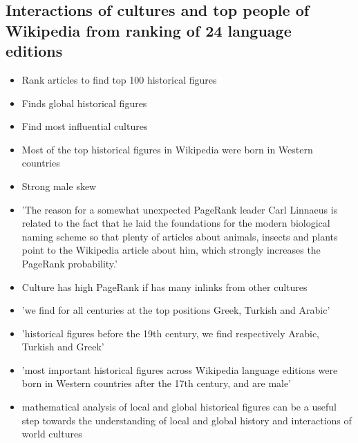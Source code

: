 \documentclass[11pt]{report}
\begin{document}
\subsection{Interactions of cultures and top people of Wikipedia from ranking of 24 language editions}
\begin{itemize}
\item Rank articles to find top 100 historical figures
\item Finds global historical figures
\item Find most influential cultures
\item Most of the top historical figures in Wikipedia were born in Western countries
\item Strong male skew
\item 'The reason for a somewhat unexpected PageRank leader Carl Linnaeus is related to the fact that he laid the foundations for the modern biological naming scheme so that plenty of articles about animals, insects and plants point to the Wikipedia article about him, which strongly increases the PageRank probability.'
\item Culture has high PageRank if has many inlinks from other cultures
\item  'we find for all centuries at the top positions Greek, Turkish and Arabic'
\item 'historical figures before
the 19th century, we find respectively Arabic, Turkish and Greek'
\item 'most important historical figures across Wikipedia language editions were born in Western countries after the 17th century, and are male'
\item mathematical analysis of local and global historical figures can be a useful
step towards the understanding of local and global history and interactions of world cultures
\end{itemize}
\end{document}
